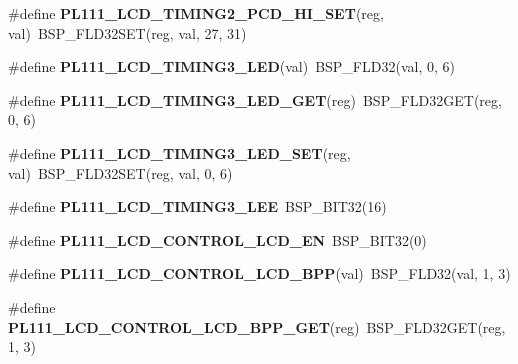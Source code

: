 \begin{DoxyCompactItemize}
\item 
\mbox{\label{arm-pl111-regs_8h_af3eac86552dc15dcaf78a1b2da8b90f9}} 
\#define {\bfseries P\+L111\+\_\+\+L\+C\+D\+\_\+\+T\+I\+M\+I\+N\+G2\+\_\+\+P\+C\+D\+\_\+\+H\+I\+\_\+\+S\+ET}(reg,  val)~B\+S\+P\+\_\+\+F\+L\+D32\+S\+ET(reg, val, 27, 31)
\item 
\mbox{\label{arm-pl111-regs_8h_a21d9ad919f67040b4325e8d54a5abe69}} 
\#define {\bfseries P\+L111\+\_\+\+L\+C\+D\+\_\+\+T\+I\+M\+I\+N\+G3\+\_\+\+L\+ED}(val)~B\+S\+P\+\_\+\+F\+L\+D32(val, 0, 6)
\item 
\mbox{\label{arm-pl111-regs_8h_a8f85a66eba1fff743cdddc5bb4e94d9d}} 
\#define {\bfseries P\+L111\+\_\+\+L\+C\+D\+\_\+\+T\+I\+M\+I\+N\+G3\+\_\+\+L\+E\+D\+\_\+\+G\+ET}(reg)~B\+S\+P\+\_\+\+F\+L\+D32\+G\+ET(reg, 0, 6)
\item 
\mbox{\label{arm-pl111-regs_8h_a69d6749874c7e0aaa69852c74d1421f8}} 
\#define {\bfseries P\+L111\+\_\+\+L\+C\+D\+\_\+\+T\+I\+M\+I\+N\+G3\+\_\+\+L\+E\+D\+\_\+\+S\+ET}(reg,  val)~B\+S\+P\+\_\+\+F\+L\+D32\+S\+ET(reg, val, 0, 6)
\item 
\mbox{\label{arm-pl111-regs_8h_a6b77ecbcdddf27db15425df239a7181a}} 
\#define {\bfseries P\+L111\+\_\+\+L\+C\+D\+\_\+\+T\+I\+M\+I\+N\+G3\+\_\+\+L\+EE}~B\+S\+P\+\_\+\+B\+I\+T32(16)
\item 
\mbox{\label{arm-pl111-regs_8h_a0d5b8ec7700b92438851a09b09b27754}} 
\#define {\bfseries P\+L111\+\_\+\+L\+C\+D\+\_\+\+C\+O\+N\+T\+R\+O\+L\+\_\+\+L\+C\+D\+\_\+\+EN}~B\+S\+P\+\_\+\+B\+I\+T32(0)
\item 
\mbox{\label{arm-pl111-regs_8h_ad6adaf1ffb667a5b62e78fc5c17af671}} 
\#define {\bfseries P\+L111\+\_\+\+L\+C\+D\+\_\+\+C\+O\+N\+T\+R\+O\+L\+\_\+\+L\+C\+D\+\_\+\+B\+PP}(val)~B\+S\+P\+\_\+\+F\+L\+D32(val, 1, 3)
\item 
\mbox{\label{arm-pl111-regs_8h_ae89364f7a32d90978cf1f5171461cea6}} 
\#define {\bfseries P\+L111\+\_\+\+L\+C\+D\+\_\+\+C\+O\+N\+T\+R\+O\+L\+\_\+\+L\+C\+D\+\_\+\+B\+P\+P\+\_\+\+G\+ET}(reg)~B\+S\+P\+\_\+\+F\+L\+D32\+G\+ET(reg, 1, 3)
\item 

\end{DoxyCompactItemize}
